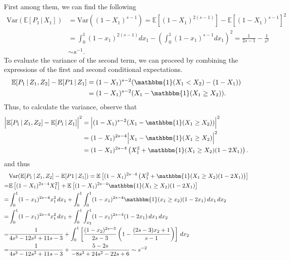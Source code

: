 \documentclass[letterpaper,10pt]{article}
\numberwithin{equation}{section}
\numberwithin{thm}{section}
\newcommand{\E}{\mathbb{E}}
\newcommand{\1}{\mathbb{1}}
\newcommand{\Var}{\text{Var}}
\begin{document}
First among them, we can find the following
\begin{equation*}
	\begin{aligned}
		\Var(\E[P_1 \, | \, X_1])
		 & = \Var\left((1-X_1)^{s-1}\right)
		= \E\left[(1-X_1)^{2(s-1)}\right] - \E\left[(1-X_1)^{s-1}\right]^2                         \\
		 & = \int_{0}^{1} (1-x_1)^{2(s-1)} d x_1 - \left(\int_{0}^{1} (1-x_1)^{s-1} d x_1\right)^2
		= \frac{1}{2s - 1} - \frac{1}{s^2}                                                         \\
		 & \sim s^{-1}.
	\end{aligned}
\end{equation*}
To evaluate the variance of the second term, we can proceed by combining the expressions of the first and second conditional expectations.
\begin{equation*}
	\begin{aligned}
		\E[P_1 \, | \, Z_1, Z_2] - \E[P1 \, | \, Z_1]
		 & = (1 - X_1)^{s-2} (\mathbbm{1}(X_1 < X_2) - (1 - X_1)) \\
		 & = (1 - X_1)^{s-2} (X_1 - \mathbbm{1}(X_1 \geq X_2)).
	\end{aligned}
\end{equation*}
Thus, to calculate the variance, observe that
\begin{equation*}
	\begin{aligned}
		\Big|\E[P_1 \, | \, Z_1, Z_2] - \E[P_1 \, | \, Z_1]\Big|^2
		 & = \Big|(1 - X_1)^{s-2} (X_1 - \mathbbm{1}(X_1 \geq X_2)) \Big|^2            \\
		 & = (1 - X_1)^{2s-4}\Big|X_1 - \mathbbm{1}(X_1 \geq X_2) \Big|^2              \\
		 & = (1 - X_1)^{2s-4}\left(X_1^2 + \mathbbm{1}(X_1 \geq X_2)(1 - 2X_1)\right).
	\end{aligned}
\end{equation*}
and thus
\begin{equation*}
	\begin{aligned}
		  & \Var(\E[P_1 \, | \, Z_1, Z_2] - \E[P1 \, | \, Z_1])
		= \E\left[(1 - X_1)^{2s-4}\left(X_1^2 + \mathbbm{1}(X_1 \geq X_2)(1 - 2X_1)\right)\right]                                                          \\
		= & \E\left[(1 - X_1)^{2s-4}X_1^2\right] + \E\left[(1 - X_1)^{2s-4}\mathbbm{1}(X_1 \geq X_2)(1 - 2X_1)\right]                                      \\
		= & \int_{0}^{1} (1 - x_1)^{2s-4}x_1^2 \, d x_1 + \int_{0}^{1}\int_{0}^{1}(1 - x_1)^{2s-4}\mathbbm{1}(x_1 \geq x_2)(1 - 2x_1) \, d x_1 \, d x_2    \\
		= & \int_{0}^{1} (1 - x_1)^{2s-4}x_1^2 \, d x_1 + \int_{0}^{1}\int_{x_2}^{1}(1 - x_1)^{2s-4}(1 - 2x_1) \, d x_1 \, d x_2                           \\
		= & \frac{1}{4s^3 - 12s^2 + 11s - 3} + \int_{0}^{1}\left[\frac{(1-x_2)^{2s-3}}{2s - 3}\left(1 - \frac{(2s - 3)x_2 + 1}{s-1}\right)\right] \, d x_2 \\
		= & \frac{1}{4s^3 - 12s^2 + 11s - 3} + \frac{5 - 2s}{-8s^3 + 24s^2 -22s + 6}
		\sim s^{-2}
	\end{aligned}
\end{equation*}
\end{document}
